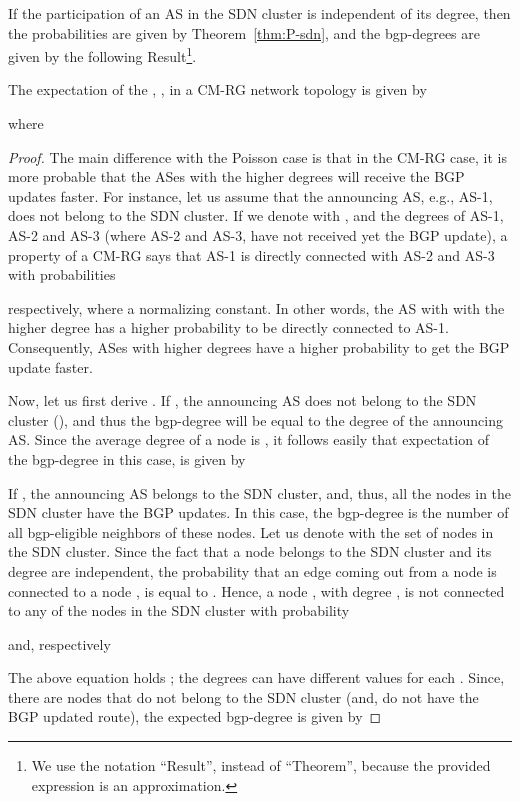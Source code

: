 If the participation of an AS in the SDN cluster is independent of its degree, then the probabilities  are given by Theorem~\ref{thm:P-sdn}, and the bgp-degrees  are given by the following Result\footnote{We use the notation ``Result'', instead of ``Theorem'', because the provided expression is an approximation.}.
\begin{result}
The expectation of the \bgp , , in a CM-RG network topology is given by

where

\end{result}
\begin{proof}
The main difference with the Poisson case is that in the CM-RG case, it is more probable that the ASes with the higher degrees will receive the BGP updates faster. For instance, let us assume that the announcing AS, e.g., AS-1, does not belong to the SDN cluster. If we denote with , and  the degrees of AS-1, AS-2 and AS-3 (where AS-2 and AS-3, have not received yet the BGP update), a property of a CM-RG says that AS-1 is directly connected with AS-2 and AS-3 with probabilities

respectively, where  a normalizing constant. In other words, the AS with with the higher degree has a higher probability to be directly connected to AS-1. Consequently, ASes with higher degrees have a higher probability to get the BGP update faster.

Now, let us first derive . If , the announcing AS does not belong to the SDN cluster (), and thus the bgp-degree will be equal to the degree of the announcing AS. Since the average degree of a node is , it follows easily that expectation of the bgp-degree in this case, is given by


If , the announcing AS belongs to the SDN cluster, and, thus, all the  nodes in the SDN cluster have the BGP updates. In this case, the bgp-degree is the number of all bgp-eligible neighbors of these  nodes. Let us denote with  the set of nodes in the SDN cluster. Since the fact that a node belongs to the SDN cluster and its degree are independent, the probability that an edge coming out from a node  is connected to a node , is equal to . Hence, a node , with degree , is not connected to any of the  nodes in the SDN cluster with probability

and, respectively

The above equation holds ; the degrees  can have different values for each . Since, there are  nodes that do not belong to the SDN cluster (and, do not have the BGP updated route), the expected bgp-degree is given by


\end{proof}

